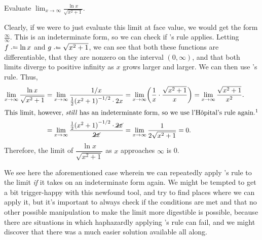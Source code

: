 \begin{example}
    Evaluate \(\displaystyle\lim_{x\to \infty}\frac{\ln x}{\sqrt{x^2 + 1}}\).\par\vspace{3pt} 
    Clearly, if we were to just evaluate this limit at face value, we would get the form \(\frac{\infty}{\infty}\). This is an indeterminate form, so we can check
    if \lh's rule applies. Letting \(f \defeq \ln x\) and \(g \defeq \sqrt{x^2 + 1}\), we can see that both these functions are differentiable, that they are nonzero 
    on the interval \((0, \infty)\), and that both limits diverge to positive infinity as \(x\) grows larger and larger. We can then use \lh's rule. Thus,\begin{align*}
        \lim_{x\to \infty}\frac{\ln x}{\sqrt{x^2 + 1}} &= \lim_{x\to \infty} \frac{1/x}{\frac{1}{2}{(x^2 + 1)}^{-1/2} \cdot 2x} = \lim_{x\to\infty} \biggl( \frac{1}{x} \cdot \frac{\sqrt{x^2 + 1}}{x} \biggr) = \lim_{x\to\infty} \frac{\sqrt{x^2 +1}}{x^2}.\\
        \intertext{This limit, however, \textit{still} has an indeterminate form, so we use \lh's rule again.\footnotemark}
        &= \lim_{x\to\infty} \frac{\frac{1}{2}{(x^2 + 1)}^{-1/2} \cdot \cancel{2x}}{\cancel{2x}} = \lim_{x\to\infty}\frac{1}{2\sqrt{x^2 +1}} = 0. 
    \end{align*}
    Therefore, the limit of \(\dfrac{\ln x}{\sqrt{x^2 + 1}}\) as \(x\) approaches \(\infty\) is 0. 
\end{example}
We see here the aforementioned case wherein we can repeatedly apply \lh's rule to the limit \textit{if} it takes on an indeterminate form again. 
We might be tempted to get a bit trigger-happy with this newfound tool, and try to find places where we can apply it, but it's important to always check 
if the conditions are met and that no other possible manipulation to make the limit more digestible is possible, because there are situations in which haphazardly applying \lh's rule can fail, and 
we might discover that there was a much easier solution available all along.
